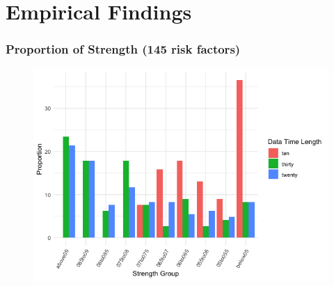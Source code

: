 \documentclass[12pt]{beamer}
\begin{document}
\section{Empirical Findings}

\begin{frame}[plain]
		\frametitle{Proportion of Strength (145 risk factors)}
\begin{figure}
        \includegraphics[scale = 0.5]{figure/strength_proportion.png}
\end{figure}
\end{frame}
\end{document}

